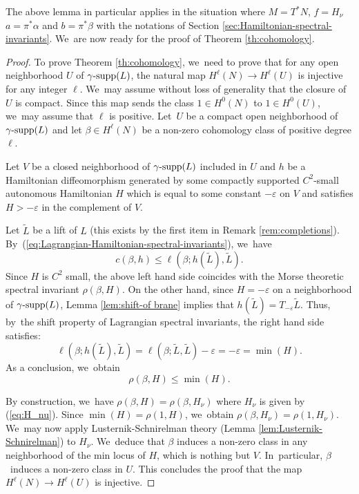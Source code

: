 \documentclass[10pt]{amsart}
\theoremstyle{definition}
\DeclareMathOperator{\gammasupp}{\gamma\textup{-supp}}
\begin{document}
The above lemma in particular applies in the situation where $M=T^*N$, $f=H_\nu$ $a=\pi^*\alpha$ and $b=\pi^*\beta$ with the notations of Section \ref{sec:Hamiltonian-spectral-invariants}. We~are now ready for the proof of Theorem \ref{th:cohomology}.

\begin{proof} To prove Theorem \ref{th:cohomology}, we~need to prove that for any open neighborhood $U$ of $\gammasupp(L)$, the natural map $H^\ell(N)\to H^\ell(U)$ is injective for any integer $\ell$. We~may assume without loss of generality that the closure of $U$ is compact. Since this map sends the class $1\in H^0(N)$ to $1\in H^0(U)$, we~may assume that $\ell$ is positive.
Let~$U$ be a compact open neighborhood of $\gammasupp(L)$ and let $\beta\in H^\ell(N)$ be a non-zero cohomology class of positive degree $\ell$.

Let $V$ be a closed neighborhood of $\gammasupp(L)$ included in $U$ and $h$ be a Hamiltonian diffeomorphism generated by some compactly supported $C^2$-small autonomous Hamiltonian $H$ which is equal to some constant $-\varepsilon$ on $V$ and satisfies $H>-\varepsilon$ in the complement of $V$.

Let $\tilde L$ be a lift of $L$ (this exists by the first item in Remark
\ref{rem:completions}). By~(\ref{eq:Lagrangian-Hamiltonian-spectral-invariants}), we~have
\[
c(\beta, h)\leq \ell(\beta; h(\tilde L),\tilde L).
\]
Since $H$ is $C^2$ small, the above left hand side coincides with the Morse theoretic spectral invariant $\rho(\beta, H)$. On the other hand, since $H=-\varepsilon$ on a neighborhood of $\gammasupp (L)$, Lemma \ref{lem:shift-of brane} implies that $h(\tilde L)=T_{-\varepsilon}\tilde L$. Thus, by~the shift property of Lagrangian spectral invariants, the right hand side satisfies:
\[
\ell(\beta; h(\tilde L),\tilde L)=\ell(\beta; \tilde L,\tilde L)-\varepsilon=-\varepsilon=\min(H).
\]
As a conclusion, we~obtain
\[
\rho(\beta, H)\leq\min(H).
\]

By construction, we~have $\rho(\beta, H)=\rho(\beta, H_\nu)$ where $H_\nu$ is given by (\ref{eq:H_nu}). Since $\min(H)=\rho(1,H)$, we~obtain $\rho(\beta, H_\nu)=\rho(1, H_\nu)$. We~may now apply Lusternik-Schnirelman theory (Lemma \ref{lem:Lusternik-Schnirelman}) to $H_\nu$. We~deduce that $\beta$ induces a non-zero class in any neighborhood of the min locus of $H$, which is nothing but $V$. In~particular, $\beta$~induces a non-zero class in $U$. This concludes the proof that the map \hbox{$H^\ell(N)\!\to\! H^\ell(U)$} is injective.
\end{proof}
\end{document}
